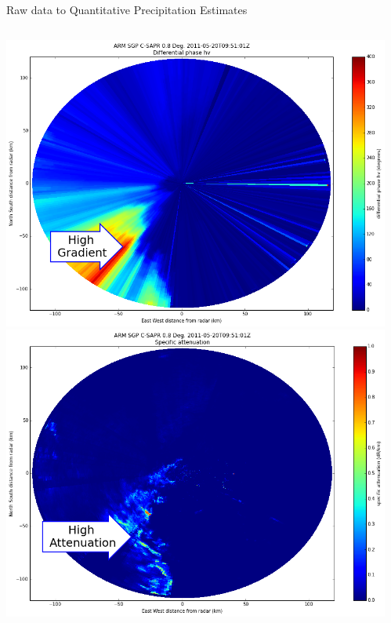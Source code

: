 \documentclass[final]{beamer}
\begin{document}
\begin{frame}{}
\begin{columns}[t]
\begin{column}{.3\linewidth}
\begin{block}{Raw data to Quantitative Precipitation Estimates}
\begin{columns}[t]
\begin{column}{.5\linewidth}
\begin{columns}[t]
\begin{column}{.5\linewidth}
           		\includegraphics[width=1.0\linewidth]{figures/phidp_f.png}\\[1ex]   %
			\includegraphics[width=1.0\linewidth]{figures/speca.png}\\[1ex]  
		\end{column}
		 \begin{column}{.5\linewidth}

\end{column}
\end{columns}
\end{column}
\end{columns}
\end{block}
\end{column}
\end{columns}
\end{frame}
\end{document}
